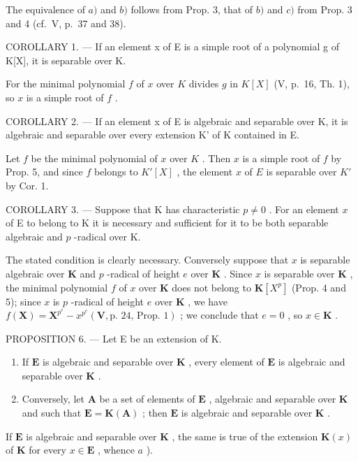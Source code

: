 The equivalence of \(a)\) and \(b)\) follows from Prop. 3, that of \(b)\) and \(c)\) from Prop. 3 and 4 (cf.~V, p.~37 and 38).

COROLLARY 1. --- If an element x of E is a simple root of a polynomial g of K{[}X{]}, it is separable over K.

For the minimal polynomial \(f\) of \(x\) over \(K\) divides \(g\) in \(K[X]\) (V, p.~16, Th. 1), so \(x\) is a simple root of \(f\) .

COROLLARY 2. --- If an element x of E is algebraic and separable over K, it is algebraic and separable over every extension K' of K contained in E.

Let \(f\) be the minimal polynomial of \(x\) over \(K\) . Then \(x\) is a simple root of \(f\) by Prop. 5, and since \(f\) belongs to \(K'[X]\) , the element \(x\) of \(E\) is separable over \(K'\) by Cor. 1.

COROLLARY 3. --- Suppose that K has characteristic \(p \neq 0\) . For an element \(x\) of E to belong to K it is necessary and sufficient for it to be both separable algebraic and \(p\) -radical over K.

The stated condition is clearly necessary. Conversely suppose that \(x\) is separable algebraic over \(\mathbf{K}\) and \(p\) -radical of height \(e\) over \(\mathbf{K}\) . Since \(x\) is separable over \(\mathbf{K}\) , the minimal polynomial \(f\) of \(x\) over \(\mathbf{K}\) does not belong to \(\mathbf{K}[X^p]\) (Prop. 4 and 5); since \(x\) is \(p\) -radical of height \(e\) over \(\mathbf{K}\) , we have \(f(\mathbf{X}) = \mathbf{X}^{p^e} - x^{p^e}(\mathbf{V},\text{p. 24, Prop. 1})\) ; we conclude that \(e = 0\) , so \(x \in \mathbf{K}\) .

PROPOSITION 6. --- Let E be an extension of K.

\begin{enumerate}
\def\labelenumi{\alph{enumi})}
\item
  If \(\mathbf{E}\) is algebraic and separable over \(\mathbf{K}\) , every element of \(\mathbf{E}\) is algebraic and separable over \(\mathbf{K}\) .
\item
  Conversely, let \(\mathbf{A}\) be a set of elements of \(\mathbf{E}\) , algebraic and separable over \(\mathbf{K}\) and such that \(\mathbf{E} = \mathbf{K}(\mathbf{A})\) ; then \(\mathbf{E}\) is algebraic and separable over \(\mathbf{K}\) .
\end{enumerate}

If \(\mathbf{E}\) is algebraic and separable over \(\mathbf{K}\) , the same is true of the extension \(\mathbf{K}(x)\) of \(\mathbf{K}\) for every \(x \in \mathbf{E}\) , whence \(a\) ).

